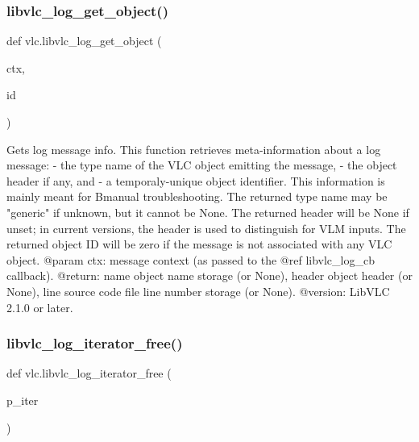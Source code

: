\subsubsection{\texorpdfstring{libvlc\+\_\+log\+\_\+get\+\_\+object()}{libvlc\_log\_get\_object()}}
{\footnotesize\ttfamily def vlc.\+libvlc\+\_\+log\+\_\+get\+\_\+object (\begin{DoxyParamCaption}\item[{}]{ctx,  }\item[{}]{id }\end{DoxyParamCaption})}

\begin{DoxyVerb}Gets log message info.
This function retrieves meta-information about a log message:
- the type name of the VLC object emitting the message,
- the object header if any, and
- a temporaly-unique object identifier.
This information is mainly meant for B{manual} troubleshooting.
The returned type name may be "generic" if unknown, but it cannot be None.
The returned header will be None if unset; in current versions, the header
is used to distinguish for VLM inputs.
The returned object ID will be zero if the message is not associated with
any VLC object.
@param ctx: message context (as passed to the @ref libvlc_log_cb callback).
@return: name object name storage (or None), header object header (or None), line source code file line number storage (or None).
@version: LibVLC 2.1.0 or later.
\end{DoxyVerb}
 \mbox{\label{namespacevlc_a37c59e68be0d4bce98e1f75b4468493b}} 
\subsubsection{\texorpdfstring{libvlc\+\_\+log\+\_\+iterator\+\_\+free()}{libvlc\_log\_iterator\_free()}}
{\footnotesize\ttfamily def vlc.\+libvlc\+\_\+log\+\_\+iterator\+\_\+free (\begin{DoxyParamCaption}\item[{}]{p\+\_\+iter }\end{DoxyParamCaption})}


